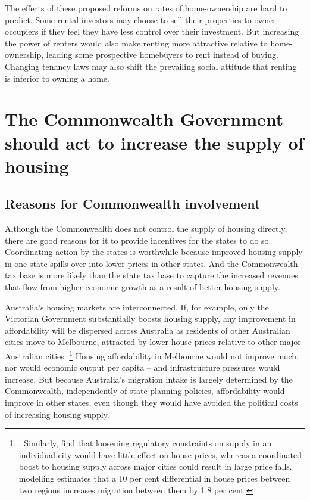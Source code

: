 The effects of these proposed reforms on rates of home-ownership are hard to predict.
Some rental investors may choose to sell their properties to owner-occupiers if they feel they have less control over their investment.
But increasing the power of renters would also make renting more attractive relative to home-ownership, leading some prospective homebuyers to rent instead of buying.
Changing tenancy laws may also shift the prevailing social attitude that renting is inferior to owning a home.

\section{The Commonwealth Government should act to increase the supply of housing}\label{sec:the-commonwealth-government-should-act-to-increase-the-supply-of-housing}

\subsection{Reasons for Commonwealth involvement}\label{subsec:reasons-for-commonwealth-involvement}

Although the Commonwealth does not control the supply of housing directly, there are good reasons for it to provide incentives for the states to do so.
Coordinating action by the states is worthwhile because improved housing supply in one state spills over into lower prices in other states.
And the Commonwealth tax base is more likely than the state tax base to capture the increased revenues that flow from higher economic growth as a result of better housing supply.

Australia's housing markets are interconnected.
If, for example, only the Victorian Government substantially boosts housing supply, any improvement in affordability will be dispersed across Australia as residents of other Australian cities move to Melbourne, attracted by lower house prices relative to other major Australian cities.%
	\footnote{\textcite[][51]{Abelson-2016-Housing-costs-policies}.
	Similarly, \textcite{Aura-Davidoff-2008-Supply-constraints} find that loosening regulatory constraints on supply in an individual city would have little effect on house prices, whereas a coordinated boost to housing supply across major cities could result in large price falls.
	\textcite[][Table~E.6]{GeographicLabourMobility}
	modelling estimates that a 10 per cent differential in house prices between two regions increases migration between them by 1.8 per cent.}
Housing affordability in Melbourne would not improve much, nor would economic output per capita -- and infrastructure pressures would increase.
But because Australia's migration intake is largely determined by the Commonwealth, independently of state planning policies,
affordability would improve in other states, even though they would have avoided the political costs of increasing housing supply. 

